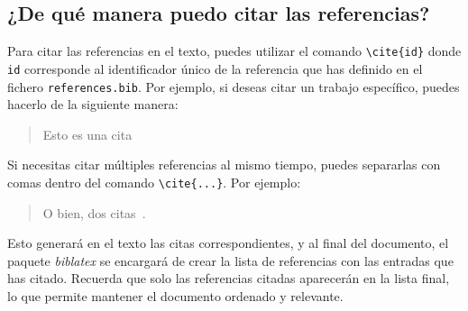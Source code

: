 \subsection{¿De qué manera puedo citar las referencias?}

Para citar las referencias en el texto, puedes utilizar el comando \texttt{\textbackslash cite\{id\}} donde \texttt{id} corresponde al identificador único de la referencia que has definido en el fichero \texttt{references.bib}. Por ejemplo, si deseas citar un trabajo específico, puedes hacerlo de la siguiente manera:

\begin{quote}
Esto es una cita ~\cite{mcculloch1943logical}
\end{quote}

Si necesitas citar múltiples referencias al mismo tiempo, puedes separarlas con comas dentro del comando \texttt{\textbackslash cite\{...\}}. Por ejemplo:

\begin{quote}
O bien, dos citas~\cite{mcculloch1943logical,kotonya1998requirements}.
\end{quote}

Esto generará en el texto las citas correspondientes, y al final del documento, el paquete \textit{biblatex} se encargará de crear la lista de referencias con las entradas que has citado. Recuerda que solo las referencias citadas aparecerán en la lista final, lo que permite mantener el documento ordenado y relevante.